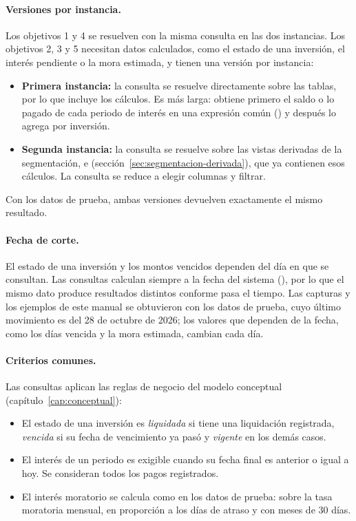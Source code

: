 \paragraph{Versiones por instancia.} Los objetivos 1 y 4 se resuelven con la misma consulta en las dos instancias. Los objetivos 2, 3 y 5 necesitan datos calculados, como el estado de una inversi\'on, el inter\'es pendiente o la mora estimada, y tienen una versi\'on por instancia:

\begin{itemize}[leftmargin=*]
	\item \textbf{Primera instancia:} la consulta se resuelve directamente sobre las tablas, por lo que incluye los c\'alculos. Es m\'as larga: obtiene primero el saldo o lo pagado de cada periodo de inter\'es en una expresi\'on com\'un () y despu\'es lo agrega por inversi\'on.
	\item \textbf{Segunda instancia:} la consulta se resuelve sobre las vistas derivadas de la segmentaci\'on,  e  (secci\'on~\ref{sec:segmentacion-derivada}), que ya contienen esos c\'alculos. La consulta se reduce a elegir columnas y filtrar.
\end{itemize}

Con los datos de prueba, ambas versiones devuelven exactamente el mismo resultado.

\paragraph{Fecha de corte.} El estado de una inversi\'on y los montos vencidos dependen del d\'ia en que se consultan. Las consultas calculan siempre a la fecha del sistema (), por lo que el mismo dato produce resultados distintos conforme pasa el tiempo. Las capturas y los ejemplos de este manual se obtuvieron con los datos de prueba, cuyo \'ultimo movimiento es del 28 de octubre de 2026; los valores que dependen de la fecha, como los d\'ias vencida y la mora estimada, cambian cada d\'ia.

\paragraph{Criterios comunes.} Las consultas aplican las reglas de negocio del modelo conceptual (cap\'itulo~\ref{cap:conceptual}):

\begin{itemize}[leftmargin=*]
	\item El estado de una inversi\'on es \textit{liquidada} si tiene una liquidaci\'on registrada, \textit{vencida} si su fecha de vencimiento ya pas\'o y \textit{vigente} en los dem\'as casos.
	\item El inter\'es de un periodo es exigible cuando su fecha final es anterior o igual a hoy. Se consideran todos los pagos registrados.
	\item El inter\'es moratorio se calcula como en los datos de prueba: sobre la tasa moratoria mensual, en proporci\'on a los d\'ias de atraso y con meses de 30 d\'ias.
\end{itemize}

